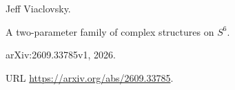 Jeff Viaclovsky.

\newblock A two-parameter family of complex structures on {$S^6$}.

\newblock arXiv:2609.33785v1, 2026{}.

\newblock URL \url{https://arxiv.org/abs/2609.33785}.
